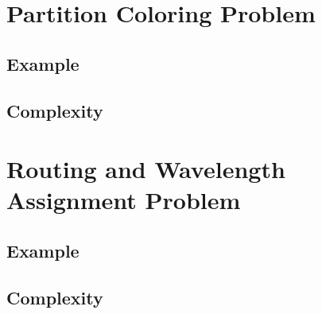 \section{Partition Coloring Problem}

\subsection{Example}

\subsection{Complexity}

\section{Routing and Wavelength Assignment Problem}

\subsection{Example}

\subsection{Complexity}


